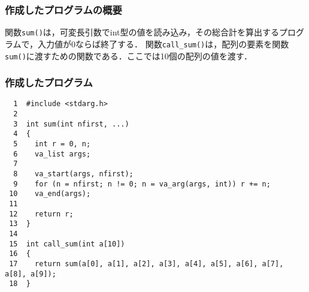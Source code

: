 \documentclass[a4j,11pt]{jarticle}
\begin{document}
  \subsubsection{作成したプログラムの概要}
  関数\verb|sum()|は，可変長引数でint型の値を読み込み，その総合計を算出するプログラムで，入力値が0ならば終了する．
  関数\verb|call_sum()|は，配列の要素を関数\verb|sum()|に渡すための関数である．ここでは10個の配列の値を渡す．
  \subsubsection{作成したプログラム}
  \begin{verbatim}
  1  #include <stdarg.h>
  2
  3  int sum(int nfirst, ...)
  4  {
  5    int r = 0, n;
  6    va_list args;
  7
  8    va_start(args, nfirst);
  9    for (n = nfirst; n != 0; n = va_arg(args, int)) r += n;
 10    va_end(args);
 11
 12    return r;
 13  }
 14
 15  int call_sum(int a[10])
 16  {
 17    return sum(a[0], a[1], a[2], a[3], a[4], a[5], a[6], a[7], a[8], a[9]);
 18  }
  \end{verbatim}
\end{document}
